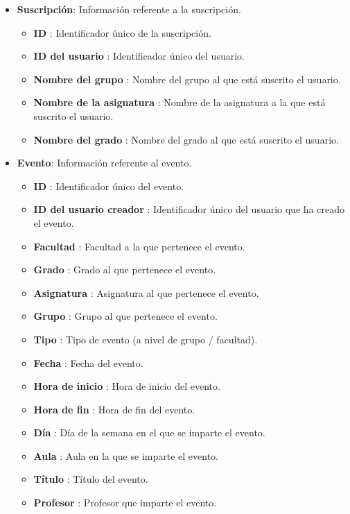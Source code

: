 \begin{itemize}
    \item \textbf{Suscripción}: Información referente a la suscripción.
    \begin{itemize}
        \item \textbf{ID} : Identificador único de la suscripción.
        \item \textbf{ID del usuario} : Identificador único del usuario.
        \item \textbf{Nombre del grupo} : Nombre del grupo al que está suscrito el usuario.
        \item \textbf{Nombre de la asignatura} : Nombre de la asignatura a la que está suscrito el usuario.
        \item \textbf{Nombre del grado} : Nombre del grado al que está suscrito el usuario.
    \end{itemize}

    \item \textbf{Evento}: Información referente al evento.
    \begin{itemize}
        \item \textbf{ID} : Identificador único del evento.
        \item \textbf{ID del usuario creador} : Identificador único del usuario que ha creado el evento.
        \item \textbf{Facultad} : Facultad a la que pertenece el evento.
        \item \textbf{Grado} : Grado al que pertenece el evento.
        \item \textbf{Asignatura} : Asignatura al que pertenece el evento.
        \item \textbf{Grupo} : Grupo al que pertenece el evento.
        \item \textbf{Tipo} : Tipo de evento (a nivel de grupo / facultad).
        \item \textbf{Fecha} : Fecha del evento.
        \item \textbf{Hora de inicio} : Hora de inicio del evento.
        \item \textbf{Hora de fin} : Hora de fin del evento.
        \item \textbf{Día} : Día de la semana en el que se imparte el evento.
        \item \textbf{Aula} : Aula en la que se imparte el evento.
        \item \textbf{Título} : Título del evento.
        \item \textbf{Profesor} : Profesor que imparte el evento.
    \end{itemize}
\end{itemize}

